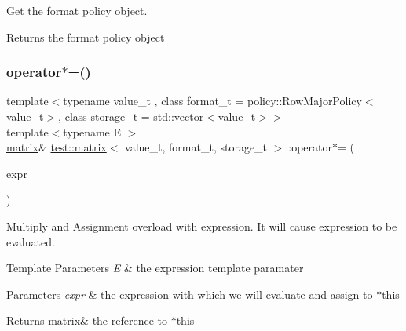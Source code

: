 Get the format policy object. 

\begin{DoxyReturn}{Returns}
the format policy object 
\end{DoxyReturn}
\mbox{\label{classtest_1_1matrix_a693b7a5396ba6a51342a525cb6738be1}} 
\subsubsection{\texorpdfstring{operator$\ast$=()}{operator*=()}}
{\footnotesize\ttfamily template$<$typename value\+\_\+t , class format\+\_\+t  = policy\+::\+Row\+Major\+Policy$<$value\+\_\+t$>$, class storage\+\_\+t  = std\+::vector$<$value\+\_\+t$>$$>$ \\
template$<$typename E $>$ \\
\mbox{\hyperlink{classtest_1_1matrix}{matrix}}\& \mbox{\hyperlink{classtest_1_1matrix}{test\+::matrix}}$<$ value\+\_\+t, format\+\_\+t, storage\+\_\+t $>$\+::operator$\ast$= (\begin{DoxyParamCaption}\item[{\mbox{\hyperlink{classtest_1_1expression}{expression}}$<$ E $>$ const \&}]{expr }\end{DoxyParamCaption})\hspace{0.3cm}{\ttfamily [inline]}}



Multiply and Assignment overload with expression. It will cause expression to be evaluated. 


\begin{DoxyTemplParams}{Template Parameters}
{\em E} & the expression template paramater \\
\hline
\end{DoxyTemplParams}

\begin{DoxyParams}{Parameters}
{\em expr} & the expression with which we will evaluate and assign to $\ast$this \\
\hline
\end{DoxyParams}
\begin{DoxyReturn}{Returns}
matrix\& the reference to $\ast$this 
\end{DoxyReturn}
\mbox{\label{classtest_1_1matrix_acacdf5c7f4c7c687691b8daf03d1821d}} 
